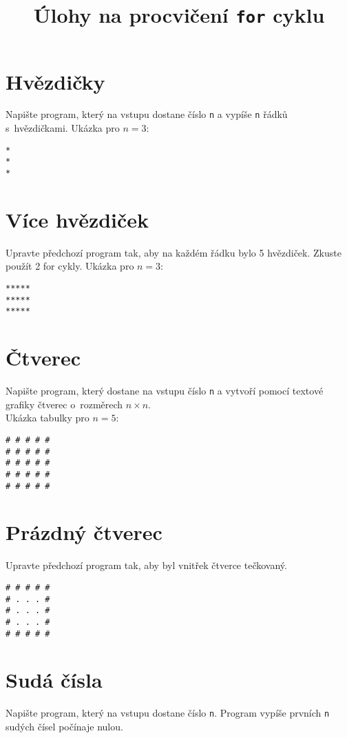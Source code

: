\documentclass[12pt,a4paper]{article}
\begin{document}
\pagestyle{empty}
\title{Úlohy na procvičení \texttt{for} cyklu}
\date{\vspace{-10ex}}
\setlength{\droptitle}{-6em}
\maketitle

\begin{multicols}{2}

\section{Hvězdičky}

Napište program, který na vstupu dostane číslo \texttt{n} a vypíše \texttt{n}
řádků s~hvězdičkami. Ukázka pro $n = 3$:
\begin{verbatim}
*
*
*
\end{verbatim}

\section{Více hvězdiček}

Upravte předchozí program tak, aby na každém řádku bylo 5 hvězdiček. Zkuste
použít 2 for cykly. Ukázka pro $n = 3$:
\begin{verbatim}
*****
*****
*****
\end{verbatim}

\section{Čtverec}

Napište program, který dostane na vstupu číslo \texttt{n} a vytvoří pomocí
textové grafiky čtverec o~rozměrech $n \times n$.\\
Ukázka tabulky pro $n = 5$:
\begin{verbatim}
# # # # #
# # # # #
# # # # #
# # # # #
# # # # #
\end{verbatim}

\section{Prázdný čtverec}

Upravte předchozí program tak, aby byl vnitřek čtverce tečkovaný.
\begin{verbatim}
# # # # #
# . . . #
# . . . #
# . . . #
# # # # #
\end{verbatim}

\section{Sudá čísla}
Napište program, který na vstupu dostane číslo \texttt{n}. Program vypíše
prvních \texttt{n} sudých čísel počínaje nulou.


\end{multicols}
\end{document}

